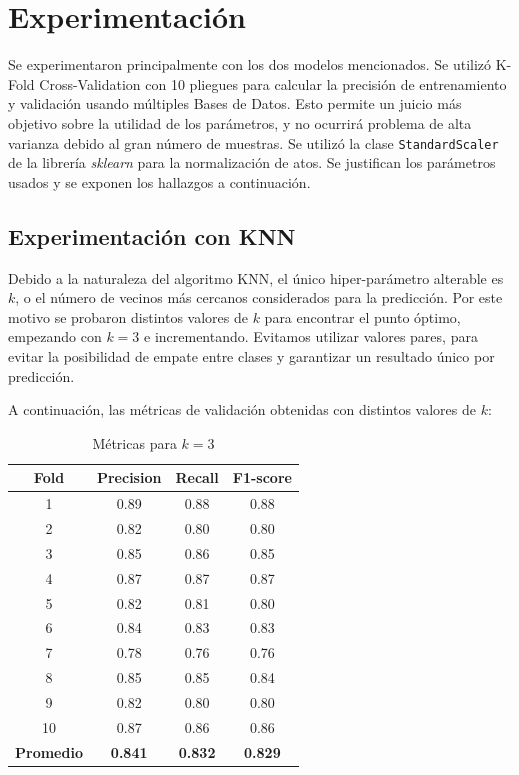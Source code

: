 \documentclass[conference]{IEEEtran}
\begin{document}
\section{Experimentación}
Se experimentaron principalmente con los dos modelos mencionados. Se utilizó K-Fold Cross-Validation con 10 pliegues para calcular la precisión de entrenamiento y validación usando múltiples Bases de Datos. Esto permite un juicio más objetivo sobre la utilidad de los parámetros, y no ocurrirá problema de alta varianza debido al gran número de muestras. Se utilizó la clase \texttt{StandardScaler} de la librería \textit{sklearn} para la normalización de atos. Se justifican los parámetros usados y se exponen los hallazgos a continuación.

\subsection{Experimentación con KNN}
Debido a la naturaleza del algoritmo KNN, el único hiper-parámetro alterable es $k$, o el número de vecinos más cercanos considerados para la predicción. Por este motivo se probaron distintos valores de $k$ para encontrar el punto óptimo, empezando con $k=3$ e incrementando. Evitamos utilizar valores pares, para evitar la posibilidad de empate entre clases y garantizar un resultado único por predicción.

A continuación, las métricas de validación obtenidas con distintos valores de $k$:


\begin{table}[htbp]
    \centering
    \begin{tabular}{cccc}
        \textbf{Fold} & \textbf{Precision} & \textbf{Recall} & \textbf{F1-score} \\
        \hline
        1 & 0.89 & 0.88 & 0.88 \\
        2 & 0.82 & 0.80 & 0.80 \\
        3 & 0.85 & 0.86 & 0.85 \\
        4 & 0.87 & 0.87 & 0.87 \\
        5 & 0.82 & 0.81 & 0.80 \\
        6 & 0.84 & 0.83 & 0.83 \\
        7 & 0.78 & 0.76 & 0.76 \\
        8 & 0.85 & 0.85 & 0.84 \\
        9 & 0.82 & 0.80 & 0.80 \\
        10 & 0.87 & 0.86 & 0.86 \\
        \hline
        \textbf{Promedio} & \textbf{0.841} & \textbf{0.832} & \textbf{0.829} \\
    \end{tabular}
    \caption{Métricas para \( k = 3 \)}
    \label{tab:knn3}
\end{table}
\end{document}
